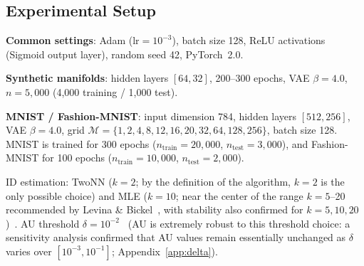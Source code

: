 \documentclass[make,article,submit,pdftex,moreauthors]{Definitions/mdpi}
\begin{document}
\subsection{Experimental Setup}\label{sec:exp_setup}

\textbf{Common settings}: Adam ($\mathrm{lr} = 10^{-3}$), batch size 128, ReLU activations (Sigmoid output layer), random seed 42, PyTorch~2.0.

\textbf{Synthetic manifolds}: hidden layers $[64, 32]$, 200--300 epochs, VAE $\beta = 4.0$, $n = 5{,}000$ (4,000 training / 1,000 test).

\textbf{MNIST / Fashion-MNIST}: input dimension 784, hidden layers $[512, 256]$, VAE $\beta = 4.0$,
grid $\mathcal{M} = \{1,2,4,8,12,16,20,32,64,128,256\}$, batch size 128.
MNIST is trained for 300 epochs ($n_{\mathrm{train}} = 20{,}000$, $n_{\mathrm{test}} = 3{,}000$),
and Fashion-MNIST for 100 epochs ($n_{\mathrm{train}} = 10{,}000$, $n_{\mathrm{test}} = 2{,}000$).

ID estimation: TwoNN ($k=2$; by the definition of the algorithm, $k=2$ is the only possible choice) and MLE ($k=10$; near the center of the range $k=5$--20 recommended by Levina \& Bickel~\cite{levina2005mle}, with stability also confirmed for $k=5,10,20$)~\cite{facco2017twonn,levina2005mle}.
AU threshold $\delta = 10^{-2}$~\cite{lucas2019elbo} (AU is extremely robust to this threshold choice: a sensitivity analysis confirmed that AU values remain essentially unchanged as $\delta$ varies over $[10^{-3}, 10^{-1}]$; Appendix~\ref{app:delta}).
\end{document}
